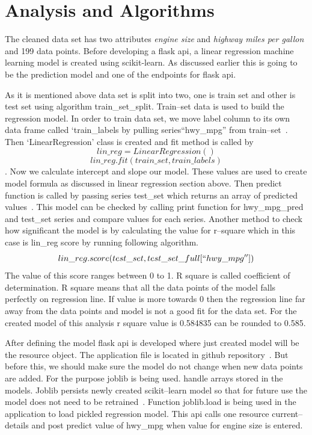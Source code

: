 \section{Analysis and Algorithms}
  The cleaned data set has two attributes \textit{engine size} and
  \textit{highway miles per gallon} and 199 data points. Before developing
   a flask api, a linear regression machine learning model is created using
   scikit-learn. As discussed earlier this is going to be the prediction model
   and one of the endpoints for flask api.

   As it is mentioned above data set is split into two, one is train
   set and other is test set using algorithm train\_set\_split. 
   Train--set data is used to build the regression
   model. In order to train data set, we move label column to its own data frame
   called `train\_labels by pulling  series``hwy\_mpg'' from 
   train--set~\cite{hid-sp18-415-regression}. Then `LinearRegression' 
   class is created and fit 
   method is called by \[lin\_reg = LinearRegression()\] 
   \[lin\_reg.fit(train\_set, train\_labels)\]. Now we calculate intercept and
  slope our model. These values are used to create model formula
  as discussed in linear regression section above. Then predict function is
  called  by passing series test\_set which returns an array of predicted 
  values~\cite{hid-sp18-415-regression}. This model can be checked by calling
  print function for hwy\_mpg\_pred
  and test\_set series and compare values for each series. Another method to
  check how significant the model is by calculating the value for r--square 
  which in this case is lin\_reg score by running following algorithm.  
  \[lin\_reg.score(test\_set, test\_set\_full[``hwy\_mpg''])\]
  The value of this score ranges between 0 to 1. R square is called coefficient
  of determination. R square means that all the data points of the model falls
  perfectly on regression line. If value is more towards 0 then the regression 
  line far away from the data points and model is not a good fit for the data
  set. For the created model of this analysis r square value is 
  0.584835 can be rounded to 0.585.
  
  After defining the model flask api is developed where just created model will 
  be the resource object. The application file is located in github 
  repository~\cite{hid-sp18-415-regressionapi}. But before this,
  we should make sure the model do not 
  change when new data points are added. For the purpose joblib is being used.
  handle arrays stored in the models. Joblib persists newly created
  scikit--learn model so that for future use the model does not need to be
  retrained~\cite{hid-sp18-415-joblib}. Function joblib.load is being used in
  the application to load pickled regression model. This api calls one resource 
  current--details  and post predict value of hwy\_mpg when value for engine
  size is entered. 
   
